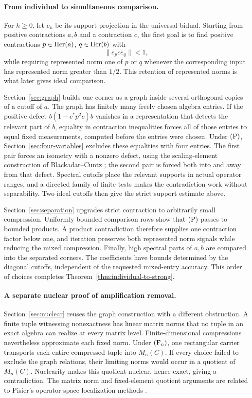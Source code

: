 \paragraph{From individual to simultaneous comparison.}
For \(h\ge0\), let \(e_h\) be its support projection in the universal
bidual.  Starting from positive contractions \(a,b\) and a contraction
\(c\), the first goal is to find positive contractions
\(p\in\operatorname{Her}(a)\), \(q\in\operatorname{Her}(b)\) with
\[
 \|e_pce_q\|<1,
\]
while requiring represented norm one of \(p\) or \(q\) whenever the
corresponding input has represented norm greater than \(1/2\).
This retention of represented norms is what later gives ideal
comparison.

Section~\ref{sec:graph} builds one corner as a graph inside several
orthogonal copies of a cutoff of \(a\).  The graph has finitely many
freely chosen algebra entries.  If the positive defect \(b(1-c^*p^2c)b\) vanishes in a
representation that detects the relevant part of \(b\), equality in
contraction inequalities forces all of
those entries to equal fixed measurements, computed before the entries
were chosen.  Under \(\textup{(P)}\), Section~\ref{sec:four-variables}
excludes these equalities with four entries.  The first pair forces
an isometry with a nonzero defect, using the scaling-element
construction of Blackadar--Cuntz
\cite{BlackadarCuntz1982,PasnicuRordam2007}; the second pair is forced
both into and away from that defect.  Spectral cutoffs place the
relevant supports in actual operator ranges, and a directed family
of finite tests makes the contradiction work without separability.
Two ideal cutoffs then give the strict support estimate above.

Section~\ref{sec:separation} upgrades strict contraction to arbitrarily
small compression.  Uniformly bounded comparison rows show that
\(\textup{(P)}\) passes to bounded products.  A product contradiction
therefore supplies one contraction factor below one, and iteration
preserves both represented norm signals while reducing the mixed
compression.  Finally, high spectral parts of \(a,b\) are compared
into the separated corners.  The coefficients have bounds determined
by the diagonal cutoffs, independent of the requested mixed-entry
accuracy.  This order of choices completes
Theorem~\ref{thm:individual-to-strong}.

\paragraph{A separate nuclear proof of amplification removal.}
Section~\ref{sec:nuclear} reuses the graph construction with a
different obstruction.  A finite tuple witnessing nonexactness has
linear matrix norms that no tuple in an exact algebra can realize
at every matrix level.  Finite-dimensional compressions nevertheless
approximate each fixed norm.  Under \(\textup{(F\ensuremath{_n})}\), one rectangular
carrier transports each entire compressed tuple into \(M_n(C)\).
If every choice failed to exclude the graph relations, their limiting
norms would occur in a quotient of \(M_n(C)\).  Nuclearity makes this
quotient nuclear, hence exact, giving a contradiction.  The matrix
norm and fixed-element quotient arguments are related to Pisier's
operator-space localization methods \cite[pp.~162--165]{Pisier1995}.

